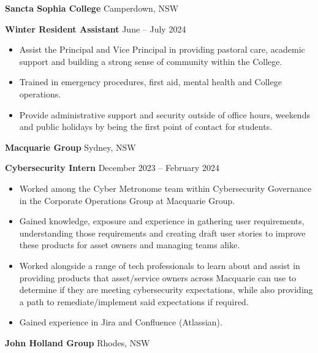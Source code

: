 \documentclass[11pt]{article}
\begin{document}
\vspace{12pt}

\textbf{Sancta Sophia College} \hfill Camperdown, NSW

\textbf{Winter Resident Assistant} \hfill June – July 2024
\begin{itemize}[noitemsep, topsep=0pt, partopsep=0pt, parsep=0pt]
    \item Assist the Principal and Vice Principal in providing pastoral care, academic support and building a strong sense of community within the College.
    \item Trained in emergency procedures, first aid, mental health and College operations.
    \item Provide administrative support and security outside of office hours, weekends and public holidays by being the first point of contact for students.
\end{itemize}

\vspace{12pt} 

\textbf{Macquarie Group} \hfill Sydney, NSW

\textbf{Cybersecurity Intern} \hfill December 2023 – February 2024
\begin{itemize}[noitemsep, topsep=0pt, partopsep=0pt, parsep=0pt]
    \item Worked among the Cyber Metronome team within Cybersecurity Governance in the Corporate Operations Group at Macquarie Group.
    \item Gained knowledge, exposure and experience in gathering user requirements, understanding those requirements and creating draft user stories to improve these products for asset owners and managing teams alike.
    \item Worked alongside a range of tech professionals to learn about and assist in providing products that asset/service owners across Macquarie can use to determine if they are meeting cybersecurity expectations, while also providing a path to remediate/implement said expectations if required.
    \item Gained experience in Jira and Confluence (Atlassian).
\end{itemize}

\vspace{12pt}

\textbf{John Holland Group} \hfill Rhodes, NSW
\end{document}
